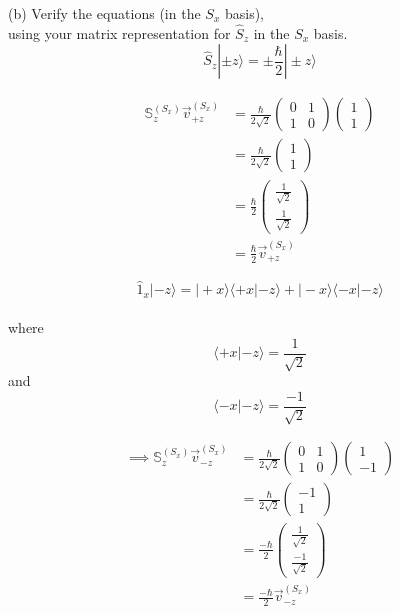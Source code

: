 \documentclass{article}
\begin{document}
\pagebreak
(b) Verify the equations (in the $S_x$ basis),\\
using your matrix representation for $\hat{S}_z$ in the $S_x$ basis.\\
$$
\hat{S}_z|\pm z\rangle=\pm \frac{\hbar}{2}|\pm z\rangle
$$

\begin{align*}
	{\mathbb{S}_z^{(S_x)} \vec{v}_{+z}^{(S_x)}} & = \frac{\hbar}{2\sqrt{2}} \left(\begin{array}{cc} 0 & 1 \\ 1 & 0 \end{array}\right) \left(\begin{array}{c} 1 \\ 1 \end{array}\right)\\
						  & = \frac{\hbar}{2\sqrt{2}} \left(\begin{array}{c} 1 \\ 1 \end{array}\right)\\
						  & = \frac{\hbar}{2} \left(\begin{array}{c} \frac{1}{\sqrt{2}} \\ \frac{1}{\sqrt{2}} \end{array}\right)\\
						  & = \frac{\hbar}{2}\vec{v}_{+z}^{(S_x)}
\end{align*}

$$ \hat{1}_x |-z\rangle = |+x\rangle \langle +x|-z\rangle + |-x\rangle \langle-x|-z\rangle$$\\
where $$\langle+x|-z\rangle = \frac{1}{\sqrt{2}}$$
and $$\langle-x|-z\rangle = \frac{-1}{\sqrt{2}}$$

\begin{align*}
	{\implies \mathbb{S}_z^{(S_x)} \vec{v}_{-z}^{(S_x)}} & = \frac{\hbar}{2\sqrt{2}} \left(\begin{array}{cc} 0 & 1 \\ 1 & 0 \end{array}\right) \left(\begin{array}{c} 1 \\ -1 \end{array}\right)\\
						  & = \frac{\hbar}{2\sqrt{2}} \left(\begin{array}{c} -1 \\ 1 \end{array}\right)\\
						  & = \frac{-\hbar}{2} \left(\begin{array}{c} \frac{1}{\sqrt{2}} \\ \frac{-1}{\sqrt{2}} \end{array}\right)\\
						  & = \frac{-\hbar}{2}\vec{v}_{-z}^{(S_x)}
\end{align*}
\pagebreak
\end{document}
